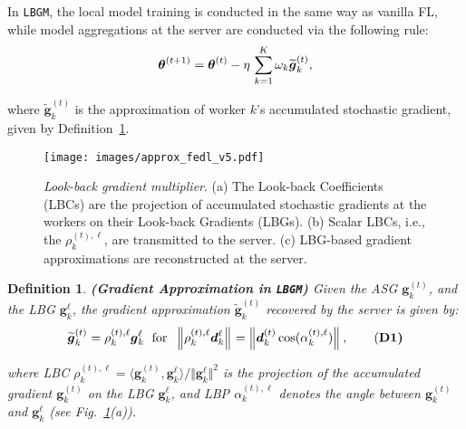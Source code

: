 \documentclass{article}
\newtheorem{defn}{Definition}
\renewcommand{\vec}[3]{\boldsymbol{#1}_{#2}^{#3}}
\newcommand{\tvec}[3]{\widetilde{\boldsymbol{#1}}_{#2}^{#3}}
\newcommand{\subsup}[3]{#1_{#2}^{#3}}
\newcommand{\norm}[2]{\left\Vert#1\right\Vert_{#2}}
\newcommand{\innorm}[2]{\Vert #1\Vert_{#2}}
\newcommand{\indotp}[2]{\langle #1, #2 \rangle}
\newcommand{\eqn}[1]{{\begin{equation}#1\end{equation}}}
\newcommand{\algName}{{\tt LBGM}}
\begin{document}
In {\algName}, the local model training is conducted in the same way as vanilla FL, while model aggregations at the server are conducted via the following rule:
\eqn{
    \vec{\theta}{}{(t+1)} = \vec{\theta}{}{(t)} - \eta\,\sum_{k=1}^K\omega_k \tvec{g}{k}{(t)},
    \label{eqn:lbgm_update}
    \vspace{-2mm}
}

\noindent where $\tvec{g}{k}{(t)}$ is the approximation of worker $k$'s accumulated stochastic gradient, given by Definition~\ref{lem:grad_proj}. 


\begin{figure}[t]
  \centering
  \centerline{\texttt{[image: images/approx\_fedl\_v5.pdf]}}
  \vskip -0.15in
  \caption{\small{\textit{Look-back gradient multiplier}. (a) The Look-back Coefficients (LBCs) are the projection of accumulated stochastic gradients at the workers on their Look-back Gradients (LBGs). (b) Scalar LBCs, i.e., the $\subsup{\rho}{k}{(t),\ell}$, are transmitted to the server. (c) LBG-based gradient approximations are reconstructed at the server.}}
  \label{fig:approx_fedl}
  \vspace{-3mm}
\end{figure}

\begin{defn}
\label{lem:grad_proj}
\textbf{(Gradient Approximation in {\algName})} Given the ASG $\vec{g}{k}{(t)}$, and the LBG $\vec{g}{k}{\ell}$, the gradient approximation $\tvec{g}{k}{(t)}$ recovered by the server is given by:
\eqn{
    \vspace{-1.1mm}
    \tvec{g}{k}{(t)} = \subsup{\rho}{k}{(t),\ell} \vec{g}{k}{\ell} \; \text{ for } \; \norm{\subsup{\rho}{k}{(t),\ell}\vec{d}{k}{\ell}}{} = \norm{\vec{d}{k}{(t)} \cos(\subsup{\alpha}{k}{(t),\ell})}{},
    \label{eqn:grad_proj}
    \tag{\bf D1}
    \vspace{-2mm}
}

\noindent where LBC $\subsup{\rho}{k}{(t),\ell} = { \indotp{ \vec{g}{k}{(t)} }{ \vec{g}{k}{\ell}} }\big/{ \innorm{\vec{g}{k}{\ell}}{}^2}$ is the projection of the accumulated gradient $\vec{g}{k}{(t)}$ on the LBG $\vec{g}{k}{\ell}$, and LBP {$\subsup{\alpha}{k}{(t),\ell}$ denotes the angle between $\vec{g}{k}{(t)}$ and $\vec{g}{k}{\ell}$} (see Fig.~\ref{fig:approx_fedl}(a)).
\end{defn}
\end{document}
